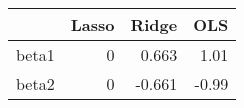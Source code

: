 
\begin{tabular}{lrrr}
\toprule
  & Lasso & Ridge & OLS\\
\midrule
beta1 & 0 & 0.663 & 1.01\\
beta2 & 0 & -0.661 & -0.99\\
\bottomrule
\end{tabular}
